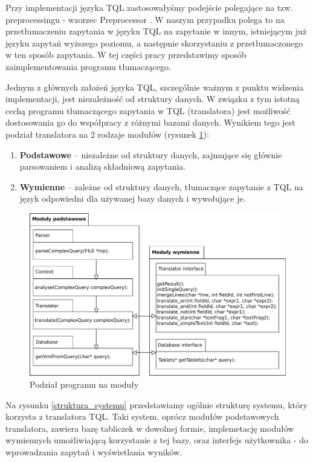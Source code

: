 
Przy implementacji języka TQL zastosowałyśmy podejście polegające na tzw. preprocessingu - wzorzec Preprocessor \cite{mernik}.
W naszym przypadku polega to na przetłumaczeniu zapytania w języku TQL na zapytanie w innym, istniejącym już języku zapytań wyższego poziomu,
a następnie skorzystaniu z przetłumaczonego w ten sposób zapytania. W tej części pracy przedstawimy sposób zaimplementowania programu tłumaczącego.

Jednym z głównych założeń języka TQL, szczególnie ważnym z punktu widzenia implementacji, jest niezależność od struktury danych.
W związku z tym istotną cechą programu tłumaczącego zapytania w TQL (translatora) jest możliwość dostosowania  
go do współpracy z różnymi bazami danych.
 Wynikiem tego jest podział translatora na 2 rodzaje modułów (rysunek \ref{moduly}):
\begin{enumerate}
 \item \textbf{Podstawowe} -- niezależne od struktury danych, zajmujące się głównie parsowaniem i analizą składniową zapytania.
 \item \textbf{Wymienne} -- zależne od struktury danych, tłumaczące zapytanie z TQL na język odpowiedni dla używanej bazy danych
i wywołujące je.
\end{enumerate}

\begin{figure}[h]
 \centering
 \includegraphics[width=450px]{../diagramy/pakiety.pdf}
 \caption{Podział programu na moduły}
 \label{moduly}
\end{figure}


Na rysunku \ref{struktura_systemu} przedstawiamy ogólnie strukturę systemu, który korzysta z translatora TQL. Taki system, oprócz modułów podstawowych translatora, zawiera bazę tabliczek w dowolnej formie, implemetację modułów wymiennych umożliwiającą korzystanie z tej bazy, oraz interfejs użytkownika - do wprowadzania zapytań i wyświetlania wyników. \\

